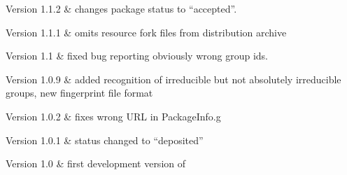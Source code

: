 Version 1.1.2 &
	changes package status to ``accepted''.
	
Version 1.1.1 & 
	omits resource fork files from distribution archive
	
Version 1.1 &
	fixed bug reporting obviously wrong group ids.
	
Version 1.0.9 & 
	added recognition of irreducible but not absolutely irreducible groups, new fingerprint file format
	
Version 1.0.2 & 
	fixes wrong URL in PackageInfo.g
	
Version 1.0.1 &
	status changed to ``deposited''
	
Version 1.0 &
 	first development version of {\IRREDSOL}
	
\enditems


